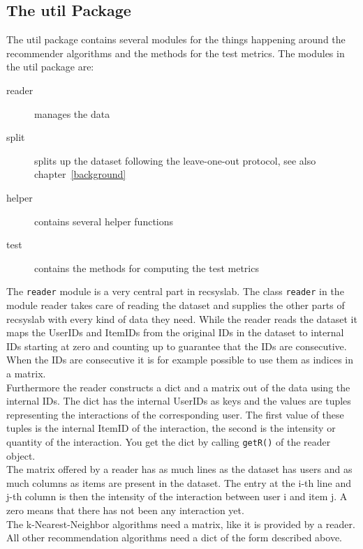 \subsection*{The util Package}
The util package contains several modules for the things happening around the 
recommender algorithms and the methods for the test metrics.
The modules in the util package are:
\begin{description}
\item[reader] manages the data
\item[split] splits up the dataset following the leave-one-out protocol, see also chapter~\ref{background}
\item[helper] contains several helper functions
\item[test] contains the methods for computing the test metrics
\end{description}
The \lstinline!reader! module is a very central part in recsyslab.
The class \lstinline!reader! in the module reader takes care of reading the dataset and 
supplies the other parts of recsyslab with every kind of data they need.
While the reader reads the dataset it maps the UserIDs and 
ItemIDs from the original IDs in the dataset to internal IDs 
starting at zero and counting up to guarantee that the IDs are consecutive. 
When the IDs are consecutive it is for example possible to use them as
indices in a matrix. \\
Furthermore the reader constructs a dict and a matrix
out of the data using the internal IDs. The dict has the internal 
UserIDs as keys and the values are tuples representing the 
interactions of the corresponding user. The first value of these tuples is the internal
ItemID of the interaction, the second is the intensity or
quantity of the interaction. You get the dict by calling \lstinline!getR()!
of the reader object. \\
The matrix offered by a reader has as much lines as the dataset
has users and as much columns as items are present in the dataset.
The entry at the i-th line and j-th column is then the intensity of the interaction
between user i and item j. A zero means that there has not been any
interaction yet.\\
The k-Nearest-Neighbor algorithms need a matrix, like it is provided by a
reader. All other recommendation algorithms need a dict of the 
form described above.

